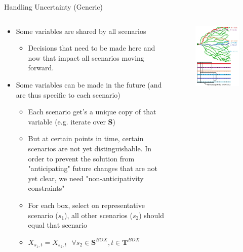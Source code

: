 \documentclass[10pt, aspectratio=169]{beamer}
\begin{document}
\begin{frame}{Handling Uncertainty (Generic)}
    \begin{columns}
        \begin{column}{0.5\textwidth}
            \begin{itemize}
                \item Some variables are shared by all scenarios
                \begin{itemize}
                    \item Decisions that need to be made here and now that impact all scenarios moving forward.
                \end{itemize}
                \item Some variables can be made in the future (and are thus specific to each scenario)
                \begin{itemize}
                    \item Each scenario get's a unique copy of that variable (e.g. iterate over \textbf{S})
                    \item But at certain points in time, certain scenarios are not yet distinguishable. In order to prevent the solution from "anticipating" future changes that are not yet clear, we need "non-anticipativity constraints"
                    \item For each box, select on representative scenario ($s_1$), all other scenarios ($s_2$) should equal that scenario 
                    \item $X_{s_1,t} = X_{s_2,t} \ \ \ \forall s_2 \in \textbf{S}^{BOX}, t \in \textbf{T}^{BOX}$
                \end{itemize}
            \end{itemize}
        \end{column}
        \begin{column}{0.5\textwidth}
            \begin{figure}
                \includegraphics[width=0.75\linewidth]{StochasticTreeHighlight.jpg}

\end{figure}
\end{column}
\end{columns}
\end{frame}
\end{document}
